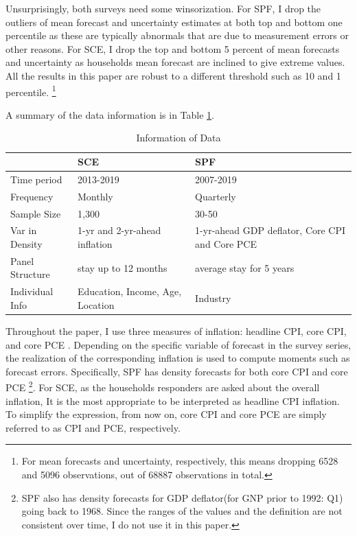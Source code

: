 \documentclass[12pt]{article}
\begin{document}
	
	Unsurprisingly, both surveys need some winsorization. For SPF, I drop the outliers of mean forecast and uncertainty estimates at both top and bottom one percentile as these are typically abnormals that are due to measurement errors or other reasons.   For SCE, I drop the top and bottom 5 percent of mean forecasts and uncertainty as households mean forecast are inclined to give extreme values. All the results in this paper are robust to a different threshold such as 10 and 1 percentile. \footnote{For mean forecasts and uncertainty, respectively, this means dropping 6528 and 5096 observations, out of 68887 observations in total.}
	
	A summary of the data information is in Table \ref{DataInfo}. 

	\begin{table}[ht]
		\caption{Information of Data}
		\label{DataInfo}
		\begin{tabularx}{\textwidth}{|X|X|X|}
			\hline 
			& SCE & SPF        \\
			\hline 
			Time period                                    & 2013-2019                           &
			 2007-2019             \\
			 \hline 
			Frequency                                      & Monthly                                 & Quarterly                \\
			\hline 
			Sample Size                                    & 1,300                                   & 30-50                    \\
			\hline 
			Var in Density                       & 1-yr and 2-yr-ahead inflation          & 1-yr-ahead GDP deflator, Core CPI and Core PCE         \\
			\hline 
			Panel Structure                               & stay up to 12 months                    & average stay for 5 years \\
			\hline 
			Individual Info                        & Education, Income, Age, Location        & Industry    \\
			\hline 
		\end{tabularx}
	\end{table}
	
	Throughout the paper, I use three measures of inflation: headline CPI, core CPI, and core PCE . Depending on the specific variable of forecast in the survey series, the realization of the corresponding inflation is used to compute moments such as forecast errors. Specifically, SPF has density forecasts for both core CPI and core PCE \footnote{SPF also has density forecasts for GDP deflator(for GNP prior to 1992: Q1) going back to 1968. Since the ranges of the values and the definition are not consistent over time, I do not use it in this paper.}. For SCE, as the households responders are asked about the overall inflation, It is the most appropriate to be interpreted as headline CPI inflation. To simplify the expression, from now on, core CPI and core PCE are simply referred to as CPI and PCE, respectively. 
\end{document}
